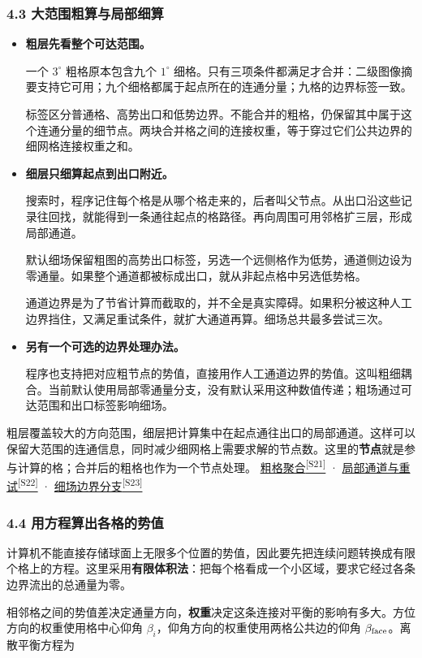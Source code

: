 \documentclass[12pt,a4paper]{article}
\numberwithin{equation}{topic}
\newcommand{\sourceref}[2]{\hyperlink{source-#1}{#2\textsuperscript{[#1]}}}
\begin{document}
\subsubsection*{4.3 大范围粗算与局部细算}

\begin{itemize}
\item \textbf{粗层先看整个可达范围。}

一个 \(3^\circ\) 粗格原本包含九个 \(1^\circ\) 细格。只有三项条件都满足才合并：二级图像摘要支持它可用；九个细格都属于起点所在的连通分量；九格的边界标签一致。

标签区分普通格、高势出口和低势边界。不能合并的粗格，仍保留其中属于这个连通分量的细节点。两块合并格之间的连接权重，等于穿过它们公共边界的细网格连接权重之和。
\item \textbf{细层只细算起点到出口附近。}

搜索时，程序记住每个格是从哪个格走来的，后者叫父节点。从出口沿这些记录往回找，就能得到一条通往起点的格路径。再向周围可用邻格扩三层，形成局部通道。

默认细场保留粗图的高势出口标签，另选一个远侧格作为低势，通道侧边设为零通量。如果整个通道都被标成出口，就从非起点格中另选低势格。

通道边界是为了节省计算而截取的，并不全是真实障碍。如果积分被这种人工边界挡住，又满足重试条件，就扩大通道再算。细场总共最多尝试三次。
\item \textbf{另有一个可选的边界处理办法。}

程序也支持把对应粗节点的势值，直接用作人工通道边界的势值。这叫粗细耦合。当前默认使用局部零通量分支，没有默认采用这种数值传递；粗场通过可达范围和出口标签影响细场。
\end{itemize}

粗层覆盖较大的方向范围，细层把计算集中在起点通往出口的局部通道。这样可以保留大范围的连通信息，同时减少细网格上需要求解的节点数。这里的\textbf{节点}就是参与计算的格；合并后的粗格也作为一个节点处理。 \sourceref{S21}{粗格聚合} · \sourceref{S22}{局部通道与重试} · \sourceref{S23}{细场边界分支}

\subsubsection*{4.4 用方程算出各格的势值}

计算机不能直接存储球面上无限多个位置的势值，因此要先把连续问题转换成有限个格上的方程。这里采用\textbf{有限体积法}：把每个格看成一个小区域，要求它经过各条边界流出的总通量为零。

相邻格之间的势值差决定通量方向，\textbf{权重}决定这条连接对平衡的影响有多大。方位方向的权重使用格中心仰角 \(\beta_i\)，仰角方向的权重使用两格公共边的仰角 \(\beta_{\rm face}\)。离散平衡方程为
\end{document}
